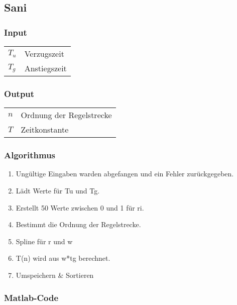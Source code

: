 \subsection{Sani}

\subsubsection*{Input}

\begin{tabular}{p{40mm}l}
    $ T_u $ & Verzugszeit \\
    $ T_g $ & Anstiegszeit
\end{tabular}

\subsubsection*{Output}
\begin{tabular}{p{40mm}l}
    $ n $ & Ordnung der Regelstrecke \\
    $ T $ & Zeitkonstante
\end{tabular}

\subsubsection*{Algorithmus}
\begin{enumerate}
    \item
        Ung\"ultige Eingaben warden abgefangen und ein Fehler zur\"uckgegeben.
    \item
        L\"adt Werte f\"ur Tu und Tg.
    \item
        Erstellt 50 Werte zwischen 0 und 1 f\"ur ri.
    \item
        Bestimmt die Ordnung der Regelstrecke.
    \item
        Spline f\"ur r und w
    \item
        T(n) wird aus w*tg berechnet.
    \item
        Umspeichern \& Sortieren
\end{enumerate}

\subsubsection*{Matlab-Code}



